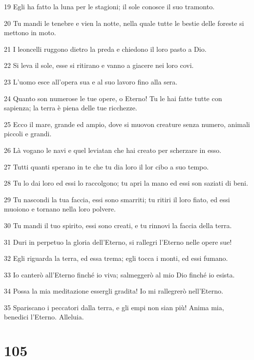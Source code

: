 \par 19 Egli ha fatto la luna per le stagioni; il sole conosce il suo tramonto.
\par 20 Tu mandi le tenebre e vien la notte, nella quale tutte le bestie delle foreste si mettono in moto.
\par 21 I leoncelli ruggono dietro la preda e chiedono il loro pasto a Dio.
\par 22 Si leva il sole, esse si ritirano e vanno a giacere nei loro covi.
\par 23 L'uomo esce all'opera sua e al suo lavoro fino alla sera.
\par 24 Quanto son numerose le tue opere, o Eterno! Tu le hai fatte tutte con sapienza; la terra è piena delle tue ricchezze.
\par 25 Ecco il mare, grande ed ampio, dove si muovon creature senza numero, animali piccoli e grandi.
\par 26 Là vogano le navi e quel leviatan che hai creato per scherzare in esso.
\par 27 Tutti quanti sperano in te che tu dia loro il lor cibo a suo tempo.
\par 28 Tu lo dai loro ed essi lo raccolgono; tu apri la mano ed essi son saziati di beni.
\par 29 Tu nascondi la tua faccia, essi sono smarriti; tu ritiri il loro fiato, ed essi muoiono e tornano nella loro polvere.
\par 30 Tu mandi il tuo spirito, essi sono creati, e tu rinnovi la faccia della terra.
\par 31 Duri in perpetuo la gloria dell'Eterno, si rallegri l'Eterno nelle opere sue!
\par 32 Egli riguarda la terra, ed essa trema; egli tocca i monti, ed essi fumano.
\par 33 Io canterò all'Eterno finché io viva; salmeggerò al mio Dio finché io esista.
\par 34 Possa la mia meditazione essergli gradita! Io mi rallegrerò nell'Eterno.
\par 35 Spariscano i peccatori dalla terra, e gli empi non sian più! Anima mia, benedici l'Eterno. Alleluia.

\chapter{105}

